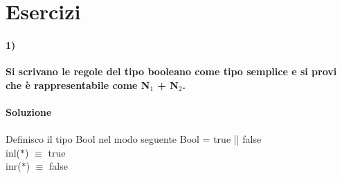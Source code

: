 \begin{prooftree}
\end{prooftree}

\section{Esercizi}
\label{sec: es-somma-disgiunta}
\paragraph{1)}
\textbf{Si scrivano le regole del tipo booleano come tipo semplice e si provi che \`e rappresentabile come N$_1$ + N$_2$.}\\\\
\textbf{Soluzione}\\\\
Definisco il tipo Bool nel modo seguente
Bool = {true || false}\\
inl($\ast$) $\equiv$ true\\
inr($\ast$) $\equiv$ false\\
